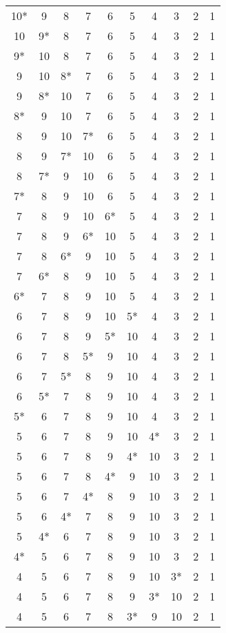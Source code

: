 \documentclass[a4paper,11pt]{article}
\begin{document}
\begin{center}
\begin{tabular}{cccccccccc}
10* & 9 & 8 & 7 & 6 & 5 & 4 & 3& 2 & 1 \\
10 & 9* & 8 & 7 & 6 & 5 & 4 & 3& 2 & 1 \\
9* & 10 & 8 & 7 & 6 & 5 & 4 & 3& 2 & 1 \\
9 & 10 & 8* & 7 & 6 & 5 & 4 & 3& 2 & 1 \\
9 & 8* & 10 & 7 & 6 & 5 & 4 & 3& 2 & 1 \\
8* & 9 & 10 & 7 & 6 & 5 & 4 & 3& 2 & 1 \\
8 & 9 & 10 & 7* & 6 & 5 & 4 & 3& 2 & 1 \\
8 & 9 & 7* & 10 & 6 & 5 & 4 & 3& 2 & 1 \\
8 & 7* & 9 & 10 & 6 & 5 & 4 & 3& 2 & 1 \\
7* & 8 & 9 & 10 & 6 & 5 & 4 & 3& 2 & 1 \\
7 & 8 & 9 & 10 & 6* & 5 & 4 & 3& 2 & 1 \\
7 & 8 & 9 & 6* & 10 & 5 & 4 & 3& 2 & 1 \\
7 & 8 & 6* & 9 & 10 & 5 & 4 & 3& 2 & 1 \\
7 & 6* & 8 & 9 & 10 & 5 & 4 & 3& 2 & 1 \\
6* & 7 & 8 & 9 & 10 & 5 & 4 & 3& 2 & 1 \\
6 & 7 & 8 & 9 & 10 & 5* & 4 & 3& 2 & 1 \\
6 & 7 & 8 & 9 & 5* & 10 & 4 & 3& 2 & 1 \\
6 & 7 & 8 & 5* & 9 & 10 & 4 & 3& 2 & 1 \\  
6 & 7 & 5* & 8 & 9 & 10 & 4 & 3& 2 & 1 \\
6 & 5* & 7 & 8 & 9 & 10 & 4 & 3& 2 & 1 \\
5* & 6 & 7 & 8 & 9 & 10 & 4 & 3& 2 & 1 \\
5 & 6 & 7 & 8 & 9 & 10 & 4* & 3& 2 & 1 \\
5 & 6 & 7 & 8 & 9 & 4* & 10 & 3& 2 & 1 \\
5 & 6 & 7 & 8 & 4* & 9 & 10 & 3& 2 & 1 \\
5 & 6 & 7 & 4* & 8 & 9 & 10 & 3& 2 & 1 \\
5 & 6 & 4* & 7 & 8 & 9 & 10 & 3& 2 & 1 \\
5 & 4* & 6 & 7 & 8 & 9 & 10 & 3& 2 & 1 \\
4* & 5 & 6 & 7 & 8 & 9 & 10 & 3& 2 & 1 \\
4 & 5 & 6 & 7 & 8 & 9 & 10 & 3* & 2 & 1 \\
4 & 5 & 6 & 7 & 8 & 9 & 3* & 10 & 2 & 1 \\
4 & 5 & 6 & 7 & 8 & 3* & 9 & 10 & 2 & 1 \\

\end{tabular}
\end{center}
\end{document}
